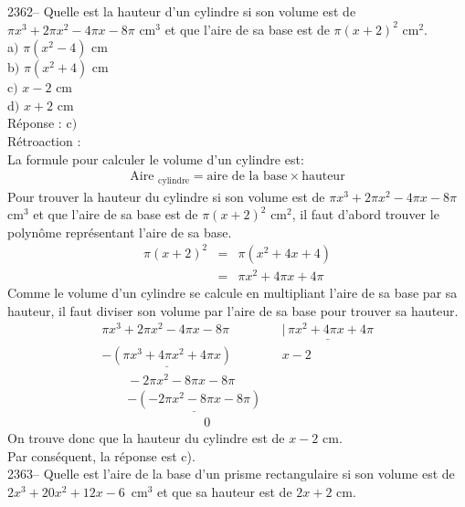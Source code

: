 \documentclass[letterpaper, 12pt]{article}
\begin{document}

2362-- Quelle est la hauteur d'un cylindre si son volume est de $\pi x^{3} + 2\pi x^{2}-4\pi x -8\pi$ cm$^{3}$ et que l'aire de sa base est de $\pi (x+2)^{2}$ cm$^{2}$.\\

a$)$ $\pi(x^{2}-4)$ cm\\
b$)$ $\pi(x^{2}+4)$ cm\\
c$)$ $x-2$ cm\\
d$)$ $x+2$ cm\\

R\'eponse : c$)$\\

R\'etroaction :\\
La formule pour calculer le volume d'un cylindre est:
\begin{eqnarray*}
 \textrm{Aire $_{\textrm{cylindre}}$}=\textrm{aire de la base}\times \textrm{hauteur}
\end{eqnarray*}
Pour trouver la hauteur du cylindre si son volume est de $\pi x^{3} + 2\pi x^{2}-4\pi x -8\pi $ cm$^{3}$ et que l'aire de sa base est de $\pi (x+2)^{2}$ cm$^{2}$, il faut d'abord trouver le polyn\^ome repr\'esentant l'aire de sa base.
\begin{eqnarray*}
 \pi (x+2)^{2}&=&\pi (x^{2}+4x+4)\\
&=&\pi x^{2}+4\pi x+4\pi
\end{eqnarray*}
Comme le volume d'un cylindre se calcule en multipliant l'aire de sa base par sa hauteur, il faut diviser son volume par l'aire de sa base pour trouver sa hauteur.
\begin{eqnarray*}
 \pi x^{3} + 2\pi x^{2}-4\pi x -8\pi  & &\underline{|\, \pi x^{2}+4\pi x+4\pi}\\
\underline{-(\pi x^{3} +4\pi x^{2}+4\pi x)} \qquad & & x - 2\\
\qquad -2\pi x^{2}-8\pi x-8\pi & &\\
\qquad \underline{-(-2\pi x^{2}-8\pi x-8\pi)} & &\\
\qquad \qquad \qquad \qquad 0 \, & &
\end{eqnarray*}
On trouve donc que la hauteur du cylindre est de $x-2$ cm.\\
Par cons\'equent, la r\'eponse est c).\\

2363-- Quelle est l'aire de la base d'un prisme rectangulaire si son volume est de \mbox{$2x^{3}+20x^{2}+12x-6$ cm$^{3}$} et que sa hauteur est de $2x+2$ cm.\\
\end{document}

